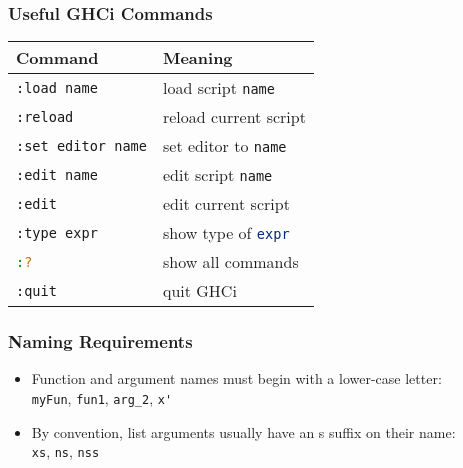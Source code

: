 \begin{multicols}{2}
\subsubsection{Useful GHCi Commands}
\begin{tabularx}{\linewidth}{|X|X|}
  \hline
  \textbf{Command} & \textbf{Meaning} \\
  \hline
  \lstinline[language=bash]|:load name| & load script \lstinline[language=bash]|name| \\
  \lstinline[language=bash]|:reload| & reload current script \\
  \lstinline[language=bash]|:set editor name| & set editor to \lstinline[language=bash]|name| \\
  \lstinline[language=bash]|:edit name| & edit script \lstinline[language=bash]|name| \\
  \lstinline[language=bash]|:edit| & edit current script \\
  \lstinline[language=bash]|:type expr| & show type of \lstinline[language=bash]|expr| \\
  \lstinline[language=bash]|:?| & show all commands \\
  \lstinline[language=bash]|:quit| & quit GHCi \\
  \hline
\end{tabularx}

\subsubsection{Naming Requirements}
\begin{itemize}
  \item Function and argument names must begin with a lower-case letter:\\
  \lstinline{myFun}, \lstinline{fun1}, \lstinline{arg_2}, \lstinline{x'}
  \item By convention, list arguments usually have an s suffix on their name:\\
  \lstinline{xs}, \lstinline{ns}, \lstinline{nss}
\end{itemize}


\end{multicols}
